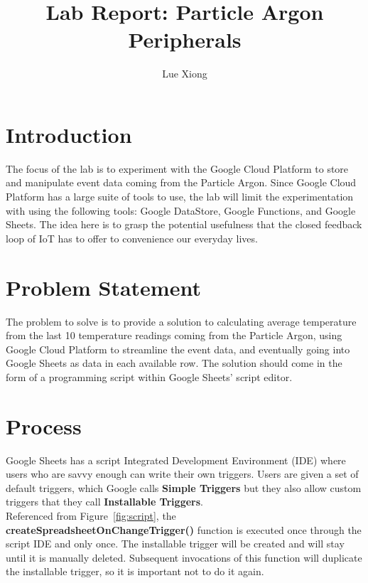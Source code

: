 \documentclass{article}
\title{Lab Report: Particle Argon Peripherals}
\author{Lue Xiong}
\begin{document}
\maketitle
\newpage

\tableofcontents
\newpage

\obeylines

\section{Introduction}
The focus of the lab is to experiment with the Google Cloud Platform to store and manipulate event data coming from the Particle Argon. Since Google Cloud Platform has a large suite of tools to use, the lab will limit the experimentation with using the following tools: Google DataStore, Google Functions, and Google Sheets. The idea here is to grasp the potential usefulness that the closed feedback loop of IoT has to offer to convenience our everyday lives.

\section{Problem Statement}
The problem to solve is to provide a solution to calculating average temperature from the last 10 temperature readings coming from the Particle Argon, using Google Cloud Platform to streamline the event data, and eventually going into Google Sheets as data in each available row. The solution should come in the form of a programming script within Google Sheets' script editor.

\section{Process}
Google Sheets has a script Integrated Development Environment (IDE) where users who are savvy enough can write their own triggers. Users are given a set of default triggers, which Google calls \textbf{Simple Triggers} but they also allow custom triggers that they call \textbf{Installable Triggers}.\\

Referenced from Figure~\ref{fig:script}, the \textbf{createSpreadsheetOnChangeTrigger()} function is executed once through the script IDE and only once. The installable trigger will be created and will stay until it is manually deleted. Subsequent invocations of this function will duplicate the installable trigger, so it is important not to do it again.\\
\end{document}
